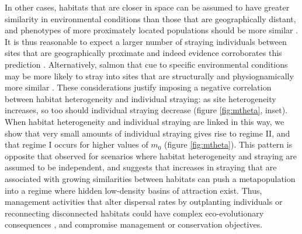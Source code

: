 \documentclass{revtex4}
\begin{document}
In other cases, habitats that are closer in space can be assumed to have greater similarity in environmental conditions than those that are geographically distant, and phenotypes of more proximately located populations should be more similar \citep{Reisenbichler:1988ex,Fraser:2011co,Westley:2012ui}.
It is thus reasonable to expect a larger number of straying individuals between sites that are geographically proximate and indeed evidence corroborates this prediction \citep{Candy:2000hu,JPE:JPE1383}.
Alternatively, salmon that cue to specific environmental conditions may be more likely to stray into sites that are structurally and physiognamically more similar \citep{Peterson:2014gy}.
These considerations justify imposing a negative correlation between habitat heterogeneity and individual straying: as site heterogeneity increases, so too should individual straying decrease (figure \ref{fig:mtheta}, inset).
When habitat heterogeneity and individual straying are linked in this way, we show that very small amounts of individual straying gives rise to regime II, and that regime I occurs for higher values of $m_0$ (figure \ref{fig:mtheta}).
This pattern is opposite that observed for scenarios where habitat heterogeneity and straying are assumed to be independent, and suggests that increases in straying that are associated with growing similarities between habitats can push a metapopulation into a regime where hidden low-density basins of attraction exist.
Thus, management activities that alter dispersal rates by outplanting individuals or reconnecting disconnected habitats could have complex eco-evolutionary consequences \citep{Anderson:2013bf,Pess:2014isa}, and compromise management or conservation objectives.


\end{document}
